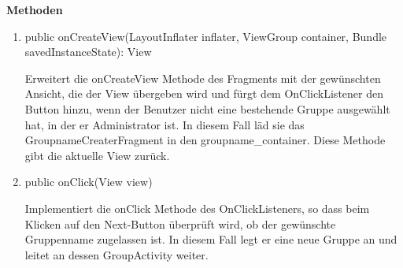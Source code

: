 \begin{enumerate}
	\textbf{Methoden}
	
	\begin{enumerate}
		\item public onCreateView(LayoutInflater inflater, ViewGroup container, Bundle savedInstanceState): View
		
		Erweitert die onCreateView Methode des Fragments mit der gewünschten Ansicht, die der View übergeben wird und fürgt dem OnClickListener den Button hinzu, wenn der Benutzer nicht eine bestehende Gruppe ausgewählt hat, in der er Administrator ist. In diesem Fall läd sie das GroupnameCreaterFragment in den groupname\_container. Diese Methode gibt die aktuelle View zurück.
		
		\item public onClick(View view)
		
		Implementiert die onClick Methode des OnClickListeners, so dass beim Klicken auf den Next-Button überprüft wird, ob der gewünschte Gruppenname zugelassen ist. In diesem Fall legt er eine neue Gruppe an und leitet an dessen GroupActivity weiter.
	\end{enumerate}

\end{enumerate}